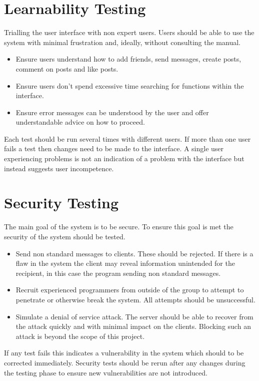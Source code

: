 \section{Learnability Testing}
Trialling the user interface with non expert users. Users should be able to use
the system with minimal frustration and, ideally, without consulting the manual.
\begin{itemize}
\item Ensure users understand how to add friends, send messages, create posts, 
comment on posts and like posts.
\item Ensure users don't spend excessive time searching for functions within the
interface.
\item Ensure error messages can be understood by the user and offer 
understandable advice on how to proceed.
\end{itemize}
Each test should be run several times with different users. If more than one 
user fails a test then changes need to be made to the interface. A single user 
experiencing problems is not an indication of a problem with the interface but 
instead suggests user incompetence.

\section{Security Testing}
The main goal of the system is to be secure. To ensure this goal is met the 
security of the system should be tested.
\begin{itemize}
\item Send non standard messages to clients. These should be rejected. If there 
is a flaw in the system the client may reveal information unintended for the 
recipient, in this case the program sending non standard messages.
\item Recruit experienced programmers from outside of the group to attempt to 
penetrate or otherwise break the system. All attempts should be unsuccessful.
\item Simulate a denial of service attack. The server should be able to recover
from the attack quickly and with minimal impact on the clients. Blocking such an
attack is beyond the scope of this project.
\end{itemize}
If any test fails this indicates a vulnerability in the system which 
should to be corrected immediately. Security tests should be rerun after any 
changes during the testing phase to ensure new vulnerabilities are not 
introduced.